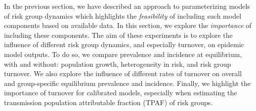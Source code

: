 In the previous section, we have described an approach to
parameterizing models of risk group dynamics which highlights the
\textit{feasibility} of including such model components based on available data.
In this section, we explore the \textit{importance} of including these components.
The aim of these experiments is to explore the influence of
different risk group dynamics, and especially turnover, on epidemic model outputs.
To do so, we compare prevalence and incidence at equilibrium, with and without:
population growth,
heterogeneity in risk, and
risk group turnover.
We also explore the influence of different rates of turnover on
overall and group-specific equilibrium prevalence and incidence.
Finally, we highlight the importance of turnover for calibrated models,
especially when estimating the transmission population attributable fraction (TPAF)
of risk groups.
